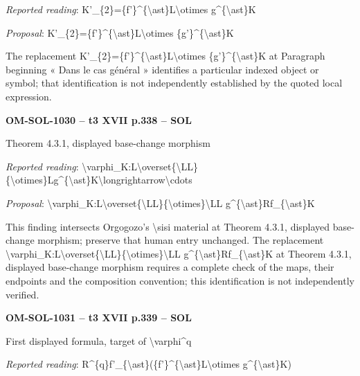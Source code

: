\emph{Reported reading}: K'\_\{2\}=\allowbreak \{f'\}\textasciicircum{}\{\textbackslash{}ast\}L\textbackslash{}otimes g\textasciicircum{}\{\textbackslash{}ast\}K\par
\emph{Proposal}: K'\_\{2\}=\allowbreak \{f'\}\textasciicircum{}\{\textbackslash{}ast\}L\textbackslash{}otimes \{g'\}\textasciicircum{}\{\textbackslash{}ast\}K\par
The replacement K'\_\{2\}=\allowbreak \{f'\}\textasciicircum{}\{\textbackslash{}ast\}L\textbackslash{}otimes \{g'\}\textasciicircum{}\{\textbackslash{}ast\}K at Paragraph beginning « Dans le cas général » identifies a particular indexed object or symbol; that identification is not independently established by the quoted local expression.\par
\par\noindent\textbf{OM-SOL-1030 -- t3 XVII p.338 -- SOL}\par
Theorem 4.3.1, displayed base-change morphism\par
\emph{Reported reading}: \textbackslash{}varphi\_K:L\textbackslash{}overset\{\textbackslash{}LL\}\{\textbackslash{}otimes\}Lg\textasciicircum{}\{\textbackslash{}ast\}K\textbackslash{}longrightarrow\textbackslash{}cdots\par
\emph{Proposal}: \textbackslash{}varphi\_K:L\textbackslash{}overset\{\textbackslash{}LL\}\{\textbackslash{}otimes\}\textbackslash{}LL g\textasciicircum{}\{\textbackslash{}ast\}Rf\_\{\textbackslash{}ast\}K\par
This finding intersects Orgogozo's \textbackslash{}sisi material at Theorem 4.3.1, displayed base-change morphism; preserve that human entry unchanged. The replacement \textbackslash{}varphi\_K:L\textbackslash{}overset\{\textbackslash{}LL\}\{\textbackslash{}otimes\}\textbackslash{}LL g\textasciicircum{}\{\textbackslash{}ast\}Rf\_\{\textbackslash{}ast\}K at Theorem 4.3.1, displayed base-change morphism requires a complete check of the maps, their endpoints and the composition convention; this identification is not independently verified.\par
\par\noindent\textbf{OM-SOL-1031 -- t3 XVII p.339 -- SOL}\par
First displayed formula, target of \textbackslash{}varphi\textasciicircum{}q\par
\emph{Reported reading}: R\textasciicircum{}\{q\}f'\_\{\textbackslash{}ast\}(\{f'\}\textasciicircum{}\{\textbackslash{}ast\}L\textbackslash{}otimes g\textasciicircum{}\{\textbackslash{}ast\}K)\par
